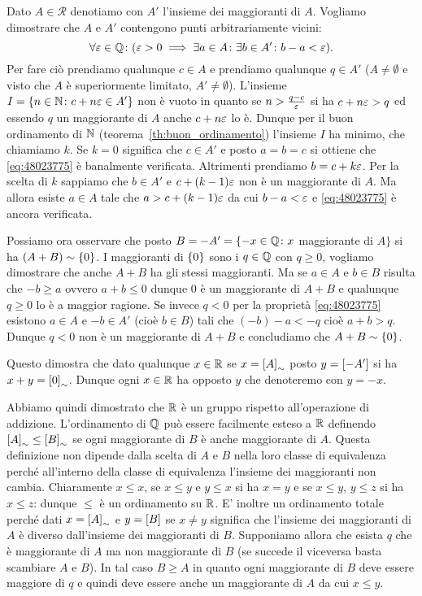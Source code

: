 Dato $A\in \mathcal R$ denotiamo con $A'$ l'insieme dei maggioranti di $A$.
Vogliamo dimostrare che $A$ e $A'$ contengono punti arbitrariamente vicini:
\begin{equation}\label{eq:48023775}
\forall \varepsilon\in{\mathbb Q}\colon (\varepsilon >0 \implies \exists a \in A\colon \exists b\in A'\colon
b-a < \varepsilon).
\end{equation}
Per fare ciò prendiamo qualunque $c\in A$ 
e prendiamo qualunque $q\in A'$ 
($A\neq \emptyset$ e visto che $A$ è superiormente limitato, 
$A'\neq \emptyset$).
L'insieme $I={\left\{ n\in {\mathbb N} \colon c+n\varepsilon\in A' \right\}}$
non è vuoto in quanto se $n>\frac{q-c}{\varepsilon}$ si ha $c+n\varepsilon>q$ ed essendo $q$ 
un maggiorante di $A$ anche $c+n\varepsilon$ lo è.
Dunque per il buon ordinamento di ${\mathbb N}$ (teorema~\ref{th:buon_ordinamento})
l'insieme $I$ ha minimo, che chiamiamo $k$.
Se $k=0$ significa che $c\in A'$ e posto $a=b=c$ si ottiene 
che \eqref{eq:48023775} è banalmente verificata.
Altrimenti prendiamo $b=c+k\varepsilon$.
Per la scelta di $k$ sappiamo che $b\in A'$ e $c+(k-1)\varepsilon$ non è un maggiorante di 
$A$. 
Ma allora esiste $a\in A$ tale che $a>c+(k-1)\varepsilon$ da cui 
$b-a < \varepsilon$ e \eqref{eq:48023775} è ancora verificata.

Possiamo ora osservare che posto $B=-A' = \{-x\in {\mathbb Q} \colon x$ maggiorante di $A\}$
si ha $(A+B)\sim{\left\{ 0 \right\}}$. 
I maggioranti di ${\left\{ 0 \right\}}$ sono i $q\in {\mathbb Q}$ con $q\ge 0$, 
vogliamo dimostrare che anche $A+B$ ha gli stessi maggioranti.
Ma se $a\in A$ e $b\in B$ risulta che $-b\ge a$ ovvero $a+b\le 0$ 
dunque $0$ è un maggiorante di $A+B$ e qualunque $q\ge 0$ lo è a maggior ragione.
Se invece $q<0$ per la proprietà \eqref{eq:48023775} esistono $a\in A$ 
e $-b\in A'$ (cioè $b\in B$) tali che $(-b)-a<-q$ cioè $a+b>q$. Dunque 
$q<0$ non è un maggiorante di $A+B$ e concludiamo che $A+B\sim{\left\{ 0 \right\}}$.

Questo dimostra che dato qualunque $x\in {\mathbb R}$ se $x={\left[ A \right]}_\sim$
posto $y={\left[ -A' \right]}$ si ha $x+y={\left[ 0 \right]}_\sim$.
Dunque ogni $x\in {\mathbb R}$ ha opposto $y$ che denoteremo 
con $y=-x$.

Abbiamo quindi dimostrato che ${\mathbb R}$ è un gruppo rispetto all'operazione 
di addizione. L'ordinamento di ${\mathbb Q}$ può essere facilmente esteso a ${\mathbb R}$
definendo ${\left[ A \right]}_\sim \le {\left[ B \right]}_\sim$ se ogni maggiorante di $B$ 
è anche maggiorante di $A$. Questa definizione non dipende dalla scelta 
di $A$ e $B$ nella loro classe di equivalenza perché all'interno della classe di 
equivalenza l'insieme dei maggioranti 
non cambia.
Chiaramente $x\le x$, se $x\le y$ e $y\le x$ si ha $x=y$ 
e se $x\le y$, $y\le z$ si ha $x\le z$: dunque $\le$ è un ordinamento su ${\mathbb R}$.
E' inoltre un ordinamento totale perché dati $x={\left[ A \right]}_\sim$ e 
$y={\left[ B \right]}$ se $x\neq y$ significa che l'insieme dei maggioranti 
di $A$ è diverso dall'insieme dei maggioranti di $B$. 
Supponiamo allora che esista $q$ che è maggiorante di $A$ 
ma non maggiorante di $B$ (se succede il viceversa basta scambiare $A$ e $B$).
In tal caso $B\ge A$ in quanto ogni maggiorante di $B$ deve essere maggiore 
di $q$ e quindi deve essere anche un maggiorante di $A$ da cui $x\le y$. 

